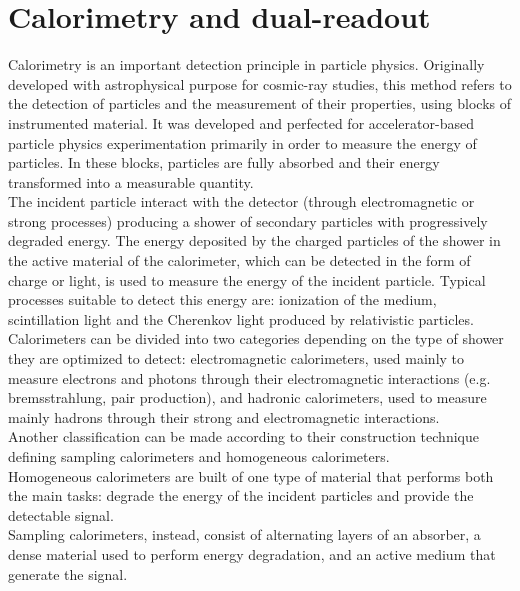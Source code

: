 \chapter{Calorimetry and dual-readout}
Calorimetry is an important detection principle in particle physics.
Originally developed with astrophysical purpose for cosmic-ray studies, this method refers to the detection of particles and the measurement of their properties, using blocks of instrumented material.
It was developed and perfected for accelerator-based particle physics experimentation primarily in order to measure the energy of particles. 
In these blocks, particles are fully absorbed and their energy transformed into a measurable quantity.\\
The incident particle interact with the detector (through electromagnetic or strong processes) producing a shower of secondary particles with progressively degraded energy.
The energy deposited by the charged particles of the shower in the active material of the calorimeter, which can be detected in the form of charge or light, is used to measure the energy of the incident particle.
Typical processes suitable to detect this energy are: ionization of the medium, scintillation light and the Cherenkov light produced by relativistic particles.\\

Calorimeters can be divided into two categories depending on the type of shower they are optimized to detect: electromagnetic calorimeters, used mainly to measure electrons and photons through their electromagnetic interactions (e.g.
bremsstrahlung, pair production), and hadronic calorimeters, used to measure mainly hadrons through their strong and electromagnetic interactions.\\
Another classification can be made according to their construction technique defining sampling calorimeters and homogeneous calorimeters.\\
Homogeneous calorimeters are built of one type of material that performs both the main tasks: degrade the energy of the incident particles and provide the detectable signal.\\
Sampling calorimeters, instead, consist of alternating layers of an absorber, a dense material used to perform energy degradation, and an active medium that generate the signal.\\

